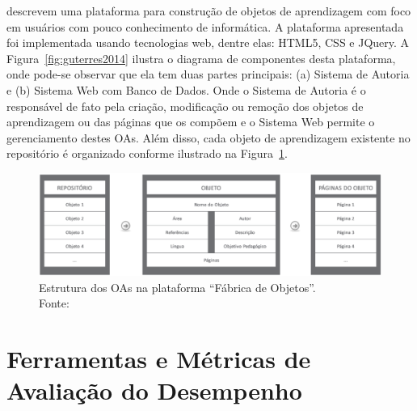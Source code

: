 \cite{Guterres:2014} descrevem uma plataforma para construção de objetos de aprendizagem com foco em usuários com pouco conhecimento de informática. A plataforma apresentada foi implementada usando tecnologias web, dentre elas: HTML5, CSS e JQuery. A Figura~\ref{fig:guterres2014} ilustra o diagrama de componentes desta plataforma, onde pode-se observar que ela tem duas partes principais: (a) Sistema de Autoria e (b) Sistema Web com Banco de Dados. Onde o Sistema de Autoria é o responsável de fato pela criação, modificação ou remoção dos objetos de aprendizagem ou das páginas que os compõem e o Sistema Web permite o gerenciamento destes OAs. Além disso, cada objeto de aprendizagem existente no repositório é organizado conforme ilustrado na Figura~\ref{fig:guterres2014_objetos}.

\begin{figure}[htb]
	\centering
	\includegraphics[width=1\linewidth]{chapters/works/guterres2014_objetos.png}
	\captionsetup{justification=centering}
	\caption{Estrutura dos OAs na plataforma ``Fábrica de Objetos''. \\Fonte:~\cite{Guterres:2014}}
	\label{fig:guterres2014_objetos}
\end{figure}



\section{Ferramentas e Métricas de Avaliação do Desempenho}\label{sec:avaliacao}


